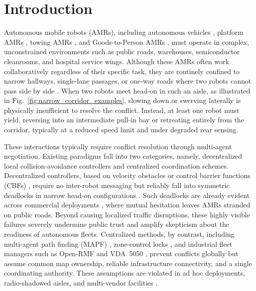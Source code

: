 \section{Introduction}
Autonomous mobile robots (AMRs), including autonomous vehicles \cite{waymo,tesla_robotaxi}, platform AMRs \cite{abb_flexley_mover}, towing AMRs \cite{abb_towing_amrs}, and Goods-to-Person AMRs \cite{abb_goods_to_person}, must operate in complex, unconstrained environments such as public roads, warehouses, semiconductor cleanrooms, and hospital service wings. Although these AMRs often work collaboratively regardless of their specific task, they are routinely confined to narrow hallways, single-lane passages, or one-way roads where two robots cannot pass side by side \cite{fragapane2021planning,xiao2022barn}. When two robots meet head-on in such an aisle, as illustrated in Fig.~\ref{fig:narrow_corridor_examples}, slowing down or swerving laterally is physically insufficient to resolve the conflict. Instead, at least one robot must yield, reversing into an intermediate pull-in bay or retreating entirely from the corridor, typically at a reduced speed limit and under degraded rear sensing. 

These interactions typically require conflict resolution through multi-agent negotiation. Existing paradigms fall into two categories, namely, decentralized local collision-avoidance controllers and centralized coordination schemes. Decentralized controllers, based on velocity obstacles \cite{vandenberg2011orca} or control barrier functions (CBFs) \cite{wang2017safety,grover2023before}, require no inter-robot messaging but reliably fall into symmetric deadlocks in narrow head-on configurations \cite{grover2023before,dergachev2021distributed,zheng2023deadlock,chandra2025deadlock}. 
Such deadlocks are already evident across commercial deployments \cite{stuff_robotaxi_standoff, king_waymo_standoff, dnistran_cruise_gridlock, nyt_waymo_honking}, where mutual hesitation leaves AMRs stranded on public roads. Beyond causing localized traffic disruptions, these highly visible failures severely undermine public trust and amplify skepticism about the readiness of autonomous fleets. Centralized methods, by contrast, including multi-agent path finding (MAPF) \cite{sharon2015cbs,stern2019mapf,okumura2022pibt}, zone-control locks \cite{fanti2002event}, and industrial fleet managers such as Open-RMF \cite{openrmf} and VDA~5050 \cite{vda5050}, prevent conflicts globally but assume common map ownership, reliable infrastructure connectivity, and a single coordinating authority. These assumptions are violated in ad hoc deployments, radio-shadowed aisles, and multi-vendor facilities \cite{gautier2022negotiated,gielis2022critical}. 

